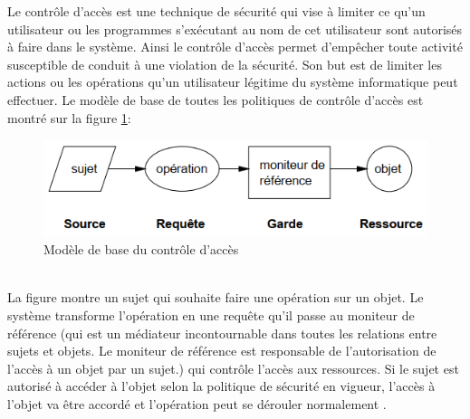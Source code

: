Le contrôle d'accès est une technique de sécurité qui vise à limiter ce qu'un utilisateur ou les programmes s'exécutant au nom de cet utilisateur sont autorisés à faire dans le système. Ainsi le contrôle d'accès permet d'empêcher toute activité susceptible de conduit à une violation de la sécurité. Son but est de limiter les actions ou les opérations qu'un utilisateur légitime du système informatique peut effectuer. Le modèle de base de toutes les politiques de contrôle d'accès est montré sur la figure \ref{figAc}:
\begin{figure}[h!]
    \centering
		\includegraphics[scale=0.7]{chap1/images/Ac.png}
    \caption{Modèle de base du contrôle d'accès \cite{jensen99}}
	 \label{figAc}
\end{figure}
\\
\hspace*{0.5 cm} La figure montre un sujet qui souhaite faire une opération sur un objet. Le système transforme l'opération en une requête qu'il passe au moniteur de référence (qui est un médiateur incontournable dans toutes les relations entre sujets et objets. Le moniteur de référence est responsable de l'autorisation de l'accès à un objet par un sujet.) qui contrôle l'accès aux ressources. Si le sujet est autorisé à accéder à l'objet selon la politique de sécurité en vigueur, l'accès à l'objet va être accordé et l'opération peut se dérouler normalement \cite{jensen99}.

